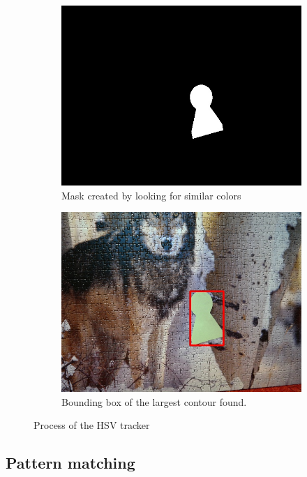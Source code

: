 \begin{figure}
\begin{subfigure}[b]{0.48\linewidth}
    \includegraphics[width=\linewidth]{img/hsv/mask.jpg}
    \caption{Mask created by looking for similar colors}
  \end{subfigure}
  \begin{subfigure}[b]{0.48\linewidth}
    \includegraphics[width=\linewidth]{img/hsv/result.jpg}
    \caption{Bounding box of the largest contour found.}
  \end{subfigure}
  \caption{Process of the HSV tracker}
  \label{fig:hsv-tracker}
\end{figure}

\subsection {Pattern matching}

